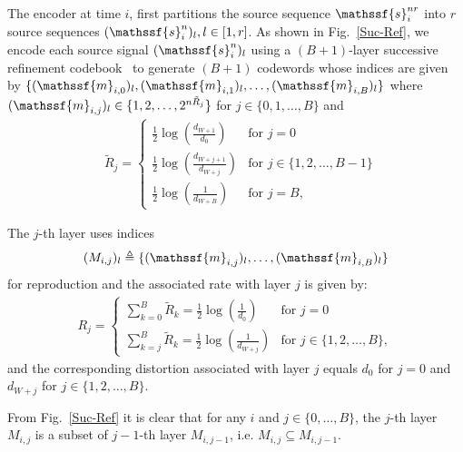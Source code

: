 \documentclass[journal, twocolumn, 10pt]{IEEEtran}
\newcommand{\defeq}{\stackrel{\Delta}{=}}
\renewcommand{\defeq}{\triangleq}
\newcommand{\rvm}{{\mathssf{m}}}    %
\newcommand{\rvs}{{\mathssf{s}}}    %
\begin{document}
{The encoder at time $i$, first partitions the source sequence $\rvs_{i}^{nr}$ into $r$ source sequences $(\rvs_{i}^{n})_{l}, l\in[1,r]$. As shown in Fig.~\ref{Suc-Ref}, we encode each source signal $(\rvs^n_{i})_{l}$ using a $(B+1)$-layer successive refinement codebook~\cite{equitzCover:91, rimoldi:94} to generate $(B+1)$ codewords whose indices are given by $\{(\rvm_{i,0})_{l}, (\rvm_{i,1})_{l}, \ldots,  (\rvm_{i,B})_{l}\}$ where $(\rvm_{i,j})_{l}\in \{1,2,\ldots,2^{n\tilde{R}_j}\}$ for $j\in\{0,1,\dots,B\}$ and
\begin{align}
&\tilde{R}_{j}=\begin{cases}
\frac{1}{2}\log(\frac{d_{W+1}}{d_{0}})& \mbox{for } j=0\\
\frac{1}{2}\log(\frac{d_{W+j+1}}{d_{W+j}})& \mbox{for } j\in\{1,2,\ldots,B-1\}\\
\frac{1}{2}\log(\frac{1}{d_{W+B}})& \mbox{for }  j=B,
\end{cases}
\end{align}

The $j$-th layer uses indices 
\begin{align}
(M_{i,j})_{l} \defeq \{(\rvm_{i,j})_{l},\ldots,(\rvm_{i,B})_{l}\}
\label{eq:Mdef}
\end{align} for reproduction and the associated rate with layer $j$ is given by:
\begin{align}
R_{j}=\begin{cases}
\sum_{k=0}^{B}\tilde{R}_{k}= \frac{1}{2}\log(\frac{1}{d_{0}})& \mbox{for } j=0\\
\sum_{k=j}^{B}\tilde{R}_{k}= \frac{1}{2}\log(\frac{1}{d_{W+j}})& \mbox{for } j\in\{1,2,\ldots,B\},
\end{cases}
\label{eq:Rdef}
\end{align}
and the corresponding distortion associated with layer $j$ equals $d_{0}$ for $j=0$ and $d_{W+j}$ for $j\in\{1,2,\ldots,B\}$.

From Fig.~\ref{Suc-Ref} it is clear that for any $i$ and $j\in \{0, \ldots, B\}$, the $j$-th layer $M_{i,j}$ is a subset of $j-1$-th layer $M_{i,j-1}$, i.e. $M_{i,j}\subseteq M_{i,j-1}$.


}
\end{document}
